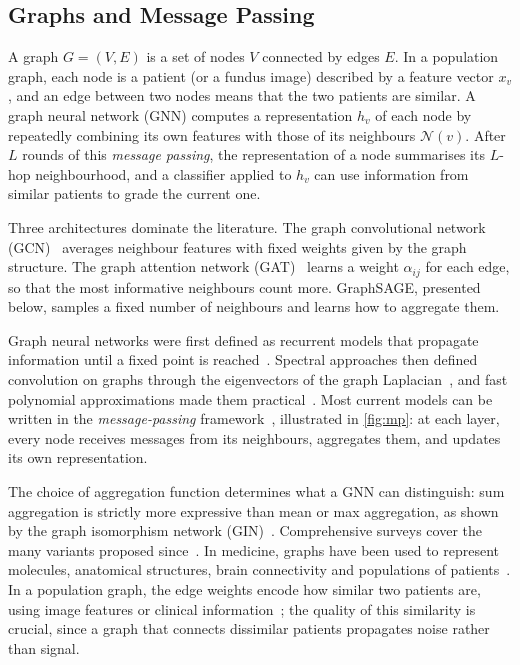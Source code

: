 \subsection{Graphs and Message Passing}

A graph $G=(V,E)$ is a set of nodes $V$ connected by edges $E$. In a population graph,
each node is a patient (or a fundus image) described by a feature vector $x_v$, and an edge
between two nodes means that the two patients are similar. A graph neural network (GNN)
computes a representation $h_v$ of each node by repeatedly combining its own features with
those of its neighbours $\mathcal{N}(v)$. After $L$ rounds of this \emph{message passing},
the representation of a node summarises its $L$-hop neighbourhood, and a classifier
applied to $h_v$ can use information from similar patients to grade the current one.

Three architectures dominate the literature. The graph convolutional network
(GCN)~\cite{kipf2017gcn} averages neighbour features with fixed weights given by the graph
structure. The graph attention network (GAT)~\cite{velickovic2018gat} learns a weight
$\alpha_{ij}$ for each edge, so that the most informative neighbours count more. GraphSAGE,
presented below, samples a fixed number of neighbours and learns how to aggregate them.

Graph neural networks were first defined as recurrent models that propagate information
until a fixed point is reached~\cite{scarselli2009gnn}. Spectral approaches then defined
convolution on graphs through the eigenvectors of the graph
Laplacian~\cite{bruna2014spectral}, and fast polynomial approximations made them
practical~\cite{defferrard2016cheb}. Most current models can be written in the
\emph{message-passing} framework~\cite{gilmer2017mpnn,hamilton2020grl}, illustrated in
\cref{fig:mp}: at each layer, every node receives messages from its neighbours, aggregates
them, and updates its own representation.



The choice of aggregation function determines what a GNN can distinguish: sum
aggregation is strictly more expressive than mean or max aggregation, as shown by the
graph isomorphism network (GIN)~\cite{xu2019gin}. Comprehensive surveys cover the many
variants proposed since~\cite{wu2021gnnsurvey,bronstein2017geometric}. In medicine, graphs
have been used to represent molecules, anatomical structures, brain connectivity and
populations of patients~\cite{ahmedt2021graphmed}. In a population graph, the edge
weights encode how similar two patients are, using image features or clinical
information~\cite{parisot2018disease}; the quality of this similarity is crucial, since a
graph that connects dissimilar patients propagates noise rather than signal.

